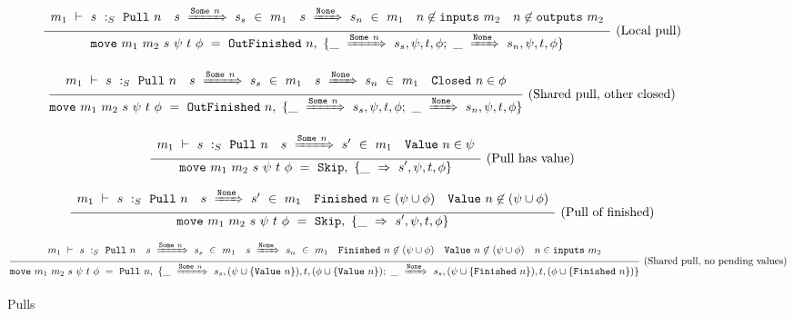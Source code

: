 \begin{figure*}


$$
\frac {\displaystyle 
    \begin{array}{lcccr}  m_1 ~\vdash~ s ~:_S~ \mathtt{Pull}~n  &  s ~\xRightarrow{\mathtt{Some}~n}~ s_s ~\in~m_1  &  s ~\xRightarrow{\mathtt{None}}~ s_n ~\in~m_1  &  n \not\in \mathtt{inputs}~m_2  &  n \not\in \mathtt{outputs}~m_2  \end{array}
} {\displaystyle 
    \mathtt{move}~m_1~m_2~s~\psi~t~\phi~=~\mathtt{OutFinished}~n,~\{ \_~\xRightarrow{\mathtt{Some}~n}~s_s, \psi, t, \phi
         ;~
          \_~\xRightarrow{\mathtt{None}}~s_n, \psi, t, \phi \}
} \ 
\textrm{(Local pull)}
$$

$$
\frac {\displaystyle 
    \begin{array}{lccr}  m_1 ~\vdash~ s ~:_S~ \mathtt{Pull}~n  &  s ~\xRightarrow{\mathtt{Some}~n}~ s_s ~\in~m_1  &  s ~\xRightarrow{\mathtt{None}}~ s_n ~\in~m_1  &  \mathtt{Closed}~n \in \phi  \end{array}
} {\displaystyle 
    \mathtt{move}~m_1~m_2~s~\psi~t~\phi~=~\mathtt{OutFinished}~n,~\{ \_~\xRightarrow{\mathtt{Some}~n}~s_s, \psi, t, \phi
         ;~
          \_~\xRightarrow{\mathtt{None}}~s_n, \psi, t, \phi \}
} \ 
\textrm{(Shared pull, other closed)}
$$


$$
\frac {\displaystyle 
    \begin{array}{lcr}  m_1 ~\vdash~ s ~:_S~ \mathtt{Pull}~n  &  s ~\xRightarrow{\mathtt{Some}~n}~ s' ~\in~m_1  &  \mathtt{Value}~n \in \psi  \end{array}
} {\displaystyle 
    \mathtt{move}~m_1~m_2~s~\psi~t~\phi~=~\mathtt{Skip},~\{ \_~\Rightarrow~s',\psi,t,\phi \}
} \ 
\textrm{(Pull has value)}
$$

$$
\frac {\displaystyle 
    \begin{array}{lccr}  m_1 ~\vdash~ s ~:_S~ \mathtt{Pull}~n  &  s ~\xRightarrow{\mathtt{None}}~ s' ~\in~m_1  &  \mathtt{Finished}~n \in (\psi \cup \phi)  &  \mathtt{Value}~n \not\in (\psi \cup \phi)  \end{array}
} {\displaystyle 
    \mathtt{move}~m_1~m_2~s~\psi~t~\phi~=~\mathtt{Skip},~\{ \_~\Rightarrow~s',\psi,t,\phi \}
} \ 
\textrm{(Pull of finished)}
$$

$$
\frac {\displaystyle 
        m_1 ~\vdash~ s ~:_S~ \mathtt{Pull}~n
        \quad
        s ~\xRightarrow{\mathtt{Some}~n}~ s_s ~\in~m_1
        \quad
        s ~\xRightarrow{\mathtt{None}}~ s_n ~\in~m_1
        \quad
        \mathtt{Finished}~n \not\in (\psi \cup \phi)
        \quad
        \mathtt{Value}~n \not\in (\psi \cup \phi)
        \quad
        n \in \mathtt{inputs}~m_2
} {\displaystyle 
    \mathtt{move}~m_1~m_2~s~\psi~t~\phi~=~\mathtt{Pull}~n,~\{ \_~\xRightarrow{\mathtt{Some}~n}~s_s, (\psi \cup \{ \mathtt{Value}~n \}), t, (\phi \cup \{ \mathtt{Value}~n \}) 
         ;~
          \_~\xRightarrow{\mathtt{None}}~s_s, (\psi \cup \{ \mathtt{Finished}~n \}), t, (\phi \cup \{ \mathtt{Finished}~n \}) 
         \}
} \ 
\textrm{(Shared pull, no pending values)}
$$

\caption{Pulls}
\label{fig:merge:gen:pull}
\end{figure*}

